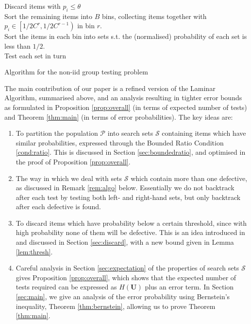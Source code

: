 \documentclass[conference]{IEEEtran}
\newcommand{\vc}[1]{{\mathbf{ #1}}}
\newcommand{\setS}{{\mathcal{S}}}
\newcommand{\setP}{{\mathcal{P}}}
\begin{document}
\begin{algorithm}
 \SetLine 
 Discard items with \(p_i \leq \theta\)
 \\
 Sort the remaining items into \(B\) bins, collecting items together with \(p_i \in \left[1/2C^r,1/2C^{r-1}\right)\) in bin \(r\).
 \\
 Sort the items in each bin into sets s.t. the (normalised) probability of each set is less than \(1/2\).
 \\
 Test each set in turn
 \\

 \caption{Algorithm for the non-iid group testing problem}
\end{algorithm}

The main contribution of our paper is a refined version of the Laminar Algorithm, summarised above, and an analysis resulting in tighter error bounds as formulated in Proposition \ref{prop:overall} (in terms of expected number of tests) and Theorem \ref{thm:main} (in terms
of error probabilities).
The  key ideas are:
\begin{enumerate}
\item To partition the population $\setP$ into search  sets  $\setS$ containing items which have similar probabilities,
expressed through the Bounded Ratio Condition \ref{cond:ratio}. This is discussed in Section \ref{sec:boundedratio}, and optimised in the proof
of Proposition \ref{prop:overall}.
\item The way in which we deal with sets $\setS$ which contain more than one defective, as discussed in Remark \ref{rem:algo} below. Essentially we do not backtrack after each test by
testing both left- and right-hand sets, but only backtrack after each defective is found.
\item To discard items which have probability below a certain
threshold, since with high probability none of them will be defective. This is an idea introduced in \cite{li5} and discussed
in Section \ref{sec:discard}, with a new bound given in Lemma \ref{lem:thresh}.
\item  Careful analysis in Section \ref{sec:expectation} of the properties of search sets $\setS$ gives Proposition \ref{prop:overall}, which shows that the expected number of tests required can
be expressed as $H(\vc{U})$ plus an error term. In Section \ref{sec:main},
we give an analysis of the error probability using Bernstein's inequality, Theorem \ref{thm:bernstein}, allowing us to
prove Theorem \ref{thm:main}.
\end{enumerate}
%
\end{document}
